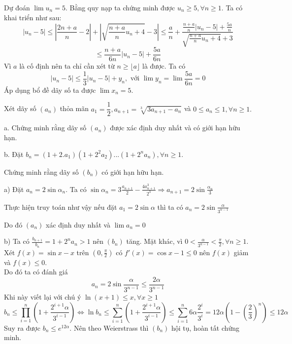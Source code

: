 \documentclass[11pt]{scrartcl}
\begin{document}
\begin{itemize}[label=, leftmargin=0em, itemsep=0.5em]
    \begin{sol}
        Dự đoán $\lim u_n = 5$. Bằng quy nạp ta chứng minh được $u_n \geq 5, \forall n \geq 1$. Ta có khai triển như sau:
        \[
            |u_n - 5| \leq |\frac{2n + a}{n} - 2| + |\sqrt{\frac{n+a}{n}u_n+4} -3| \leq \frac{a}{n} + \frac{\frac{n + a}{n}|u_n - 5| + \frac{5a}{n}}{\sqrt{\frac{ n+a}{n}u_n + 4} + 3}
        \]
        \[
            \leq \frac{n + a}{6n}|u_n - 5| + \frac{5a}{6n}
        \]  
        Vì $a$ là cố định nên ta chỉ cần xét từ $n \geq \lfloor a \rfloor $ là được. Ta có 
        \[|u_n - 5| \leq \frac{1}{3}|u_n -5| + y_n, \text{ với } \lim y_n = \lim \frac{5a}{6n} = 0\]
        Áp dụng bổ đề dãy số ta được $\lim x_n = 5$.
    \end{sol}
    \begin{bt}
        Xét dãy số $(a_n)$ thỏa mãn $a_1=\dfrac{1}{2}, a_{n+1}=\sqrt[3]{3a_{n+1}-a_n}$ và $0\le a_n\le 1, \forall n\ge 1.$

a. Chứng minh rằng dãy số $(a_n)$ được xác định duy nhất và có giới hạn hữu hạn.

b. Đặt $b_n=(1+2.a_1)(1+2^2a_2)...(1+2^na_n), \forall n\ge 1.$

Chứng minh rằng dãy số $(b_n)$ có giới hạn hữu hạn.
    \end{bt}

    \begin{sol}
        a) Đặt $a_n = 2\sin{\alpha_n}$. Ta có $\sin{\alpha_n} = 3\frac{a_{n + 1}}{2} - \frac{4a_{n + 1}^3}{2^3} \Rightarrow a_{n + 1} = 2\sin{\frac{\alpha_n}{3}}$
        

        Thực hiện truy toán như vậy nếu đặt $a_1 = 2\sin{\alpha}$ thì ta có $a_n = 2\sin{\frac{\alpha}{3^{n-1}}}$
        

        Do đó $(a_n)$ xác định duy nhất và $\lim a_n = 0$


        b) Ta có $\frac{b_{n + 1}}{b_n} = 1 + 2^na_n > 1$ nên $(b_n)$ tăng. Mặt khác, vì $0 < \frac{\alpha}{3^{n-1}} < \frac{\pi}{2}, \forall n \geq 1$.\\ Xét $f(x) = \sin{x} - x$ trên $(0, \frac{\pi}{2})$ có $f'(x) = \cos{x} - 1 \leq 0$ nên $f(x)$ giảm và $f(x) \leq 0$.\\ Do đó ta có đánh giá $$a_n =  2\sin{\frac{\alpha}{3^{n-1}}} \leq \frac{2\alpha}{3^{n-1}}$$
        Khi này viết lại với chú ý $\ln(x + 1) \leq x, \forall x \geq 1$
        \[
            b_n \leq  \prod_{i = 1}^n \left(1 + \frac{2^{i + 1}\alpha}{3^{i - 1}}\right)
            \Leftrightarrow \ln b_n \leq \sum _{i = 1}^n  \left(1 + \frac{2^{i + 1}\alpha}{3^{i - 1}}\right) \leq \sum_{i = 1}^n 6\alpha\frac{2^i}{3^i} = 12\alpha\left(1 - \left(\frac{2}{3}\right)^n\right) \leq 12\alpha
        \]
        Suy ra được $b_n \leq e^{12\alpha}$. Nên theo Weierstrass thì $(b_n)$ hội tụ, hoàn tất chứng minh.
    \end{sol}


\end{itemize}
\end{document}
